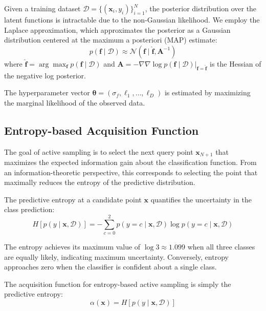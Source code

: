 \documentclass[a4paper,fleqn]{cas-dc}
\let\origsubsection\subsection
\renewcommand{\subsection}{\FloatBarrier\origsubsection}
\begin{document}
Given a training dataset $\mathcal{D} = \{(\mathbf{x}_i, y_i)\}_{i=1}^{N}$, the posterior distribution over the latent functions is intractable due to the non-Gaussian likelihood. We employ the Laplace approximation, which approximates the posterior as a Gaussian distribution centered at the maximum a posteriori (MAP) estimate:
\begin{equation}
p(\mathbf{f} \mid \mathcal{D}) \approx \mathcal{N}(\mathbf{f} \mid \hat{\mathbf{f}}, \mathbf{A}^{-1})
\end{equation}
where $\hat{\mathbf{f}} = \arg\max_{\mathbf{f}} p(\mathbf{f} \mid \mathcal{D})$ and $\mathbf{A} = -\nabla\nabla \log p(\mathbf{f} \mid \mathcal{D})|_{\mathbf{f}=\hat{\mathbf{f}}}$ is the Hessian of the negative log posterior.

The hyperparameter vector $\boldsymbol{\theta} = (\sigma_f, \ell_1, \ldots, \ell_D)$ is estimated by maximizing the marginal likelihood of the observed data.

\subsection{Entropy-based Acquisition Function}

The goal of active sampling is to select the next query point $\mathbf{x}_{N+1}$ that maximizes the expected information gain about the classification function. From an information-theoretic perspective, this corresponds to selecting the point that maximally reduces the entropy of the predictive distribution.

The predictive entropy at a candidate point $\mathbf{x}$ quantifies the uncertainty in the class prediction:
\begin{equation}\label{eq:entropy}
H[p(y \mid \mathbf{x}, \mathcal{D})] = -\sum_{c=0}^{2} p(y = c \mid \mathbf{x}, \mathcal{D}) \log p(y = c \mid \mathbf{x}, \mathcal{D})
\end{equation}

The entropy achieves its maximum value of $\log 3 \approx 1.099$ when all three classes are equally likely, indicating maximum uncertainty. Conversely, entropy approaches zero when the classifier is confident about a single class.

The acquisition function for entropy-based active sampling is simply the predictive entropy:
\begin{equation}
\alpha(\mathbf{x}) = H[p(y \mid \mathbf{x}, \mathcal{D})]
\end{equation}
\end{document}
